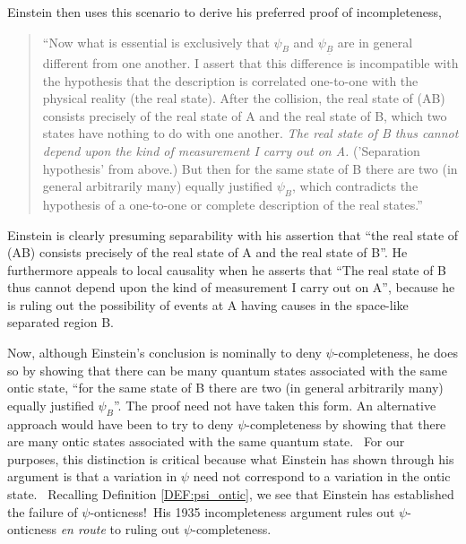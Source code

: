 \documentclass[aps,nofootinbib,12pt]{revtex4}
\begin{document}
Einstein then uses this scenario to derive his preferred proof of
incompleteness,


\begin{quote}
``Now what is essential is exclusively that $\psi_{B}$ and
$\psi_{\underline{B}}$ are in general different from one another. I
assert that this difference is incompatible with the hypothesis that
the description is correlated one-to-one with the physical reality
(the real state). After the collision, the real state of (AB)
consists precisely of the real state of A and the real state of B,
which two states have nothing to do with one another. \emph{The real
state of B thus cannot depend upon the kind of measurement I carry
out on A.} ('Separation hypothesis' from above.) But then for the
same state of B there are two (in general arbitrarily many) equally
justified $\psi_{B}$, which contradicts the hypothesis of a
one-to-one or complete description of the real states.''
\end{quote}

Einstein is clearly presuming separability with his assertion that
``the real state of (AB) consists precisely of the real state of A
and the real state of B''.
He furthermore appeals to local causality when he asserts that ``The
real state of B thus cannot depend upon the kind of measurement I
carry out on A'', because he is ruling out the possibility of events
at A having causes in the space-like separated region B.

Now, although Einstein's conclusion is nominally to deny
$\psi$-completeness, he does so by showing that there can be many
quantum states associated with the same ontic state, ``for the same
state of B there are two (in general arbitrarily many) equally
justified $\psi_{B}$''. The proof need not have taken this form. An
alternative approach would have been to try to deny
$\psi$-completeness by showing that there are many ontic states
associated with the same quantum state. \ For our purposes, this
distinction is critical because what Einstein has shown through his
argument is that a variation in $\psi$ need not correspond to a
variation in the ontic state. \ Recalling Definition
\ref{DEF:psi_ontic}, we see that Einstein has established the
failure of $\psi $-onticness!\ His 1935 incompleteness argument
rules out $\psi$-onticness \emph{en route} to ruling out
$\psi$-completeness.
\end{document}
